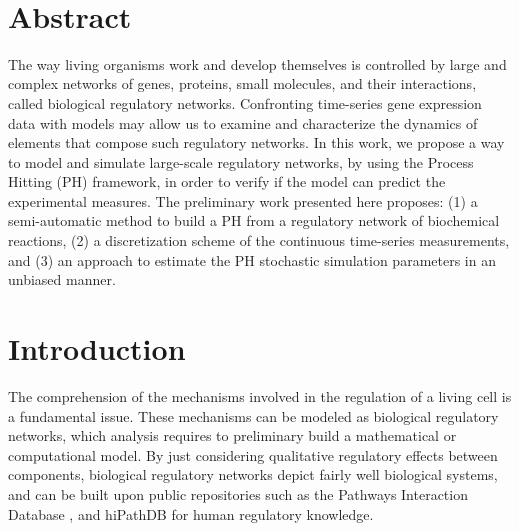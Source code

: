 \documentclass[11pt,a4paper,twoside]{epig}
\begin{document}
\\

\section*{Abstract}
\vspace{-2mm}
The way living organisms work and develop themselves is controlled by large and complex 
networks of genes, proteins, small molecules, and their interactions, called biological 
regulatory networks. Confronting time-series gene expression data with models may allow us to
examine and characterize the dynamics of elements that compose such  regulatory networks. 
In this work, we propose a way to model and simulate large-scale regulatory networks, by using the 
Process Hitting (PH) framework, in order to verify if the model can predict the experimental measures.
The preliminary work presented here proposes: (1) a semi-automatic method to build a PH from
a regulatory network of biochemical reactions, (2) a discretization scheme of the continuous time-series measurements, 
and (3) an approach to estimate the PH stochastic simulation parameters in an unbiased manner.
\vspace{-2mm}



\section{Introduction}
The comprehension of the mechanisms involved in the regulation of a living cell is a fundamental 
issue. These mechanisms can be modeled as biological regulatory networks, which analysis requires to preliminary build a 
mathematical or computational model. 
By just considering qualitative regulatory effects between components, biological regulatory networks
depict fairly well biological systems, and can be built upon public repositories such as the Pathways 
Interaction Database \cite{schaefer2009pid}, and 
hiPathDB\cite{yu2012hipathdb} for human regulatory knowledge.
\end{document}

